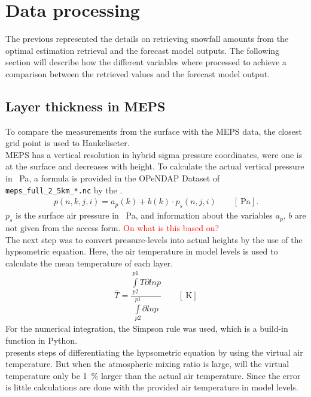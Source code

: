 \section{Data processing} \label{sec:data_proc}
The previous  represented the details on retrieving snowfall amounts from the optimal estimation retrieval and the forecast model outputs. The following section will describe how the different variables where processed to achieve a comparison between the retrieved values and the forecast model output. 

\subsection{Layer thickness in MEPS}\label{sec:layer_thickness}
To compare the measurements from the surface with the MEPS data, the closest grid point is used to Haukeliseter.
\\
MEPS has a vertical resolution in hybrid sigma pressure coordinates, were one is at the surface and decreases with height. To calculate the actual vertical pressure in \SI{}{\Pa}, a formula is provided in the OPeNDAP Dataset of \texttt{meps\_full\_2\_5km\_*.nc} by the \cite{norwegian_meteorological_institute_met_2016}.  
\begin{align}
p(n,k,j,i) = a_p(k) + b(k) \cdot p_s(n,j,i) \qquad [\SI{}{\Pa}].
\label{eq:hybrid_sigma_pressure}
\end{align}
$p_s$ is the surface air pressure in \SI{}{\Pa}, and information about the variables $a_p$, $b$ are not given from the access form. \textcolor{red}{On what is this based on?}  
\\
The next step was to convert pressure-levels into actual heights by the use of the hypsometric equation. Here, the air temperature in model levels is used to calculate the mean temperature of each layer. 
\begin{align}
\overline{T} = \dfrac{\int\limits_{p2}^{p1} T \partial ln p}{\int\limits_{p2}^{p1}\partial ln p} \qquad [\SI{}{\kelvin}]
\label{eq:T_avg}
\end{align}
For the numerical integration, the Simpson rule was used, which is a build-in function in Python. \\
\cite{martin_mid-latitude_2006} presents steps of differentiating the hypsometric equation by using the virtual air temperature. But when the atmospheric mixing ratio is large, will the virtual temperature only be \SI{1}{\percent} larger than the actual air temperature. Since the error is little calculations are done with the provided air temperature in model levels.
